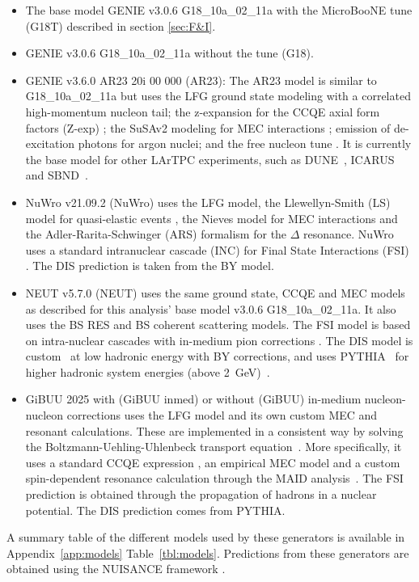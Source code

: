 \documentclass[amsmath,amssymb,aps,prd,showpacs,twocolumn,superscriptaddress,letterpaper,longbibliography, floatfix]{revtex4-2}
\begin{document}
\begin{itemize}
    \item The base model GENIE v3.0.6 G18\_10a\_02\_11a with the MicroBooNE tune (G18T) described in section \ref{sec:F&I}.
    \item GENIE v3.0.6 G18\_10a\_02\_11a without the tune (G18).
    \item GENIE v3.6.0 AR23 20i 00 000 (AR23): The AR23 model is similar to G18\_10a\_02\_11a but uses the LFG ground state modeling with a correlated high-momentum nucleon tail; the z-expansion for the CCQE axial form factors (Z-exp) \cite{ZEXP}; the SuSAv2 modeling for MEC interactions \cite{SuSAv2}; emission of de-excitation photons for argon nuclei; and the free nucleon tune \cite{TUNEfreeNuc}. It is currently the base model for other LArTPC experiments, such as DUNE~\cite{DUNEnuscale}, ICARUS~\cite{ICARUSexotics} and SBND~\cite{SBNDPRISM}.
    \item NuWro v21.09.2 (NuWro) \cite{NuWro} uses the LFG model, the Llewellyn-Smith (LS) model for quasi-elastic events \cite{LLEWELLYNSMITH1972}, the Nieves model for MEC interactions \cite{2p2hNieves} and the Adler-Rarita-Schwinger (ARS) formalism \cite{AdlerRES} for the $\Delta$ resonance. NuWro uses a standard intranuclear cascade (INC) for Final State Interactions (FSI) \cite{NucTransp,FSIEffects}. The DIS prediction is taken from the BY model.
    \item NEUT v5.7.0 (NEUT) \cite{NEUT} uses the same ground state, CCQE and MEC models as described for this analysis' base model v3.0.6 G18\_10a\_02\_11a. It also uses the BS RES \cite{BergerSehgal2007,QuarkRES,Auchincloss:1990tu} and BS coherent \cite{BSCOH} scattering models. The FSI model is based on intra-nuclear cascades with in-medium pion corrections \cite{SALCEDO1988557}. The DIS model is custom~\cite{Gl_ck_1998} at low hadronic energy with BY corrections, and uses PYTHIA~\cite{PYTHIA} for higher hadronic system energies (above 2~GeV)~\cite{Bronner_2016}.
    \item GiBUU 2025 \cite{GiBuu} with (GiBUU inmed) or without (GiBUU) in-medium nucleon-nucleon corrections \cite{INMEDIUMGIBUU} uses the LFG model and its own custom MEC and resonant calculations. These are implemented in a consistent way by solving the Boltzmann-Uehling-Uhlenbeck transport equation~\cite{Mosel_2019}. More specifically, it uses a standard CCQE expression \cite{GiBUUCCQE}, an empirical MEC model and a custom spin-dependent resonance calculation through the MAID analysis~\cite{Mosel_2019}. The FSI prediction is obtained through the propagation of hadrons in a nuclear potential. The DIS prediction comes from PYTHIA.
\end{itemize}
A summary table of the different models used by these generators is available in Appendix~\ref{app:models} Table~\ref{tbl:models}. Predictions from these generators are obtained using the NUISANCE framework \cite{NUISANCE}.  
\end{document}
